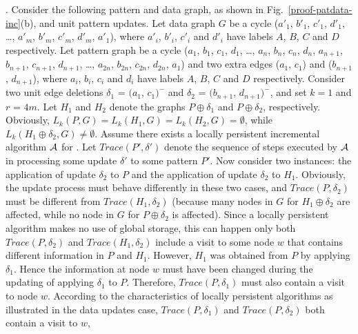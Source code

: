 \vspace{-1.5ex}
.
Consider the following pattern and data graph, as shown in Fig.~\ref{proof-patdata-inc}(b), and unit pattern updates.
Let data graph $G$ be a cycle ($a'_1$, $b'_1$, $c'_1$, $d'_1$, \ldots, $a'_m$, $b'_m$, $c'_m$, $d'_m$, $a'_1$),
where $a'_i$, $b'_i$, $c'_i$ and $d'_i$ have labels $A$, $B$, $C$ and $D$ respectively.
Let pattern graph be a cycle ($a_1$, $b_1$, $c_1$, $d_1$, \ldots, $a_n$, $b_n$, $c_n$, $d_n$, $a_{n+1}$, $b_{n+1}$, $c_{n+1}$, $d_{n+1}$, \ldots, $a_{2n}$, $b_{2n}$, $c_{2n}$, $d_{2n}$, $a_1$) and two extra edges ($a_1$, $c_1$) and ($b_{n+1}$, $d_{n+1}$),
where $a_i$, $b_i$, $c_i$ and $d_i$ have labels $A$, $B$, $C$ and $D$ respectively.
Consider two unit edge deletions $\delta_1$ = $(a_1$, $c_1)^-$ and $\delta_2$ = $(b_{n+1}$, $d_{n+1})^-$,
and set $k = 1$ and $r$ = $4m$.
Let $H_1$ and $H_2$ denote the graphs $P\oplus \delta_1$ and $P\oplus \delta_2$, respectively.
Obviously, $L_{k}(P, G) = L_{k}(H_1, G) = L_{k}(H_2, G) = \emptyset$,
while $L_{k}(H_1\oplus \delta_2, G) \neq \emptyset$.
Assume there exists a locally persistent incremental algorithm ${\cal A}$ for \dynteamF.
Let $Trace(P', \delta')$ denote the sequence of steps executed by ${\cal A}$ in processing some update $\delta'$ to some pattern $P'$.
Now consider two instances: the application of update $\delta_2$ to $P$ and the application of update $\delta_2$ to $H_1$.
Obviously, the update process must behave differently in these two cases, and $Trace(P, \delta_2)$ must be different from $Trace(H_1, \delta_2)$
(because many nodes in $G$ for $H_1\oplus \delta_2$ are affected, while no node in $G$ for $P\oplus \delta_2$ is affected).
Since a locally persistent algorithm makes no use of global storage,
this can happen only both $Trace(P, \delta_2)$ and $Trace(H_1, \delta_2)$ include a visit to some node $w$ that contains different information in $P$ and $H_1$.
However, $H_1$ was obtained from $P$ by applying $\delta_1$.
Hence the information at node $w$ must have been changed during the updating of applying $\delta_1$ to $P$.
Therefore, $Trace(P, \delta_1)$ must also contain a visit to node $w$.
According to the characteristics of locally persistent algorithms as illustrated in the data updates case,
$Trace(P, \delta_1)$ and $Trace(P, \delta_2)$ both contain a visit to $w$,
